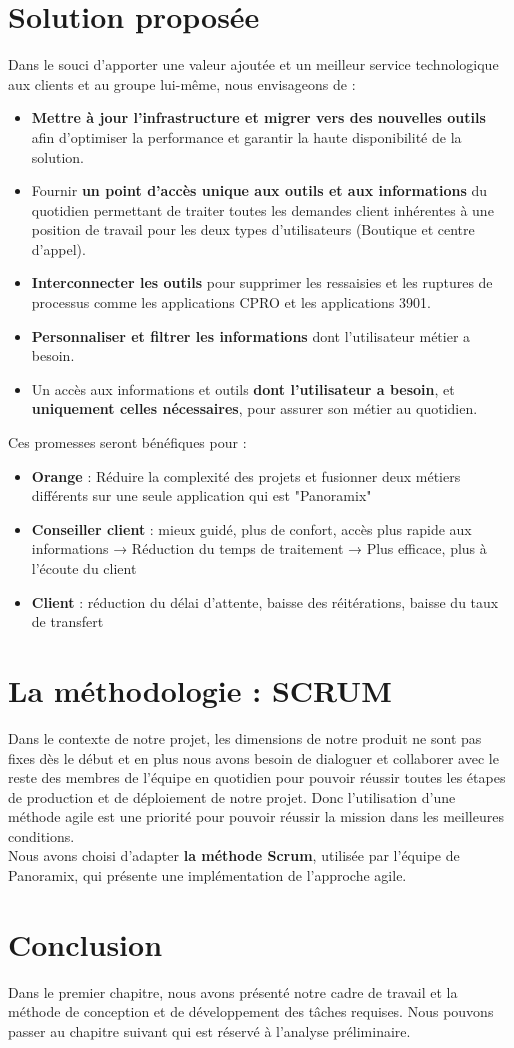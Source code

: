 \section[Solution proposée]{Solution proposée}
Dans le souci d’apporter une valeur ajoutée et un meilleur service technologique aux clients et au groupe lui-même, nous envisageons de :
\begin{itemize}
	\item \textbf{Mettre à jour l'infrastructure et migrer vers des nouvelles outils} afin d'optimiser la performance et garantir la haute disponibilité de la solution.
	\item Fournir \textbf{un point d’accès unique aux outils et aux informations} du quotidien permettant de traiter toutes les demandes client inhérentes à une position de travail pour les deux types d'utilisateurs (Boutique et centre d’appel).
	\item \textbf{Interconnecter les outils} pour supprimer les ressaisies et les ruptures de processus comme les applications CPRO et les applications 3901.
	\item \textbf{Personnaliser et filtrer les informations} dont l’utilisateur métier a besoin.
	\item Un accès aux informations et outils \textbf{dont l’utilisateur a besoin}, et \textbf{uniquement celles nécessaires}, pour assurer son métier au quotidien.
	
\end{itemize}
Ces promesses seront bénéfiques pour :
\begin{itemize}
	\item \textbf{Orange} : Réduire la complexité des projets et fusionner deux métiers différents sur une seule application qui est "Panoramix" \\
	\item \textbf{Conseiller client } : mieux guidé, plus de confort, accès plus rapide aux informations
	\subitem → Réduction du temps  de traitement
	\subitem → Plus efficace, plus à l’écoute du client
	\item \textbf{Client} : réduction du délai d’attente, baisse des réitérations, baisse du taux de transfert
\end{itemize}
\section[La méthodologie : SCRUM]{La méthodologie : SCRUM}
Dans le contexte de notre projet, les dimensions de notre produit ne sont pas fixes dès le début et en plus nous avons besoin de dialoguer  et collaborer avec le reste des membres de l’équipe en quotidien pour pouvoir réussir toutes les étapes de production et de déploiement de notre projet. Donc l’utilisation d’une méthode agile est une priorité pour pouvoir réussir la mission dans les meilleures conditions. 
\\
Nous avons choisi d’adapter \textbf{la méthode Scrum}, utilisée par l’équipe de Panoramix, qui présente une implémentation de l’approche agile.
\section*{Conclusion}
Dans le premier chapitre, nous avons présenté notre cadre de travail et la méthode de conception et de développement des tâches requises. Nous pouvons passer au chapitre suivant qui est réservé à l’analyse préliminaire.